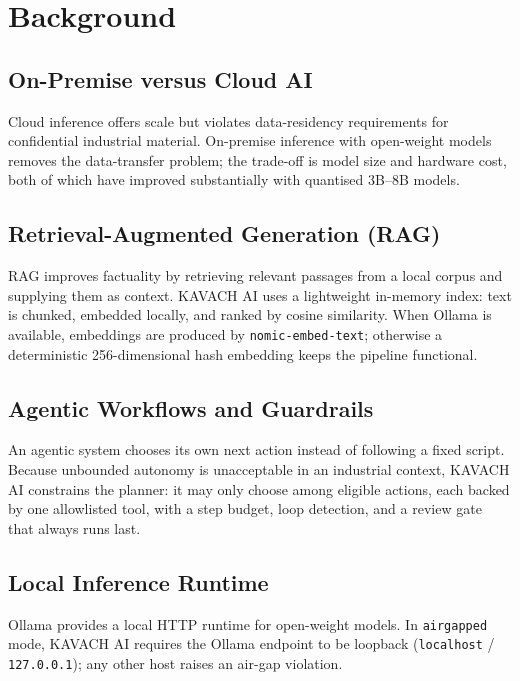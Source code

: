 \documentclass[11pt,a4paper]{article}
\newcommand{\projectname}{KAVACH AI}
\begin{document}
\section{Background}

\subsection{On-Premise versus Cloud AI}
Cloud inference offers scale but violates data-residency requirements for
confidential industrial material. On-premise inference with open-weight models
removes the data-transfer problem; the trade-off is model size and hardware
cost, both of which have improved substantially with quantised 3B--8B models.

\subsection{Retrieval-Augmented Generation (RAG)}
RAG improves factuality by retrieving relevant passages from a local corpus and
supplying them as context. \projectname{} uses a lightweight in-memory index:
text is chunked, embedded locally, and ranked by cosine similarity. When Ollama
is available, embeddings are produced by \texttt{nomic-embed-text}; otherwise a
deterministic 256-dimensional hash embedding keeps the pipeline functional.

\subsection{Agentic Workflows and Guardrails}
An agentic system chooses its own next action instead of following a fixed
script. Because unbounded autonomy is unacceptable in an industrial context,
\projectname{} constrains the planner: it may only choose among eligible
actions, each backed by one allowlisted tool, with a step budget, loop
detection, and a review gate that always runs last.

\subsection{Local Inference Runtime}
Ollama provides a local HTTP runtime for open-weight models. In
\texttt{airgapped} mode, \projectname{} requires the Ollama endpoint to be
loopback (\texttt{localhost} / \texttt{127.0.0.1}); any other host raises an
air-gap violation.
\end{document}
